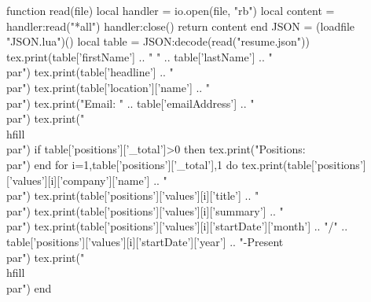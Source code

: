 \documentclass{article}
\begin{document}
\begin{luacode}
function read(file)
    local handler = io.open(file, "rb")
    local content = handler:read("*all")
    handler:close()
    return content
end
JSON = (loadfile "JSON.lua")()
local table = JSON:decode(read("resume.json"))
tex.print(table['firstName'] .. " " .. table['lastName'] .. "\\par")
tex.print(table['headline'] .. "\\par")
tex.print(table['location']['name'] .. "\\par")
tex.print("Email: " .. table['emailAddress'] .. "\\par")
tex.print("\\hfill\\par")
if table['positions']['_total']>0 then
  tex.print("Positions:\\par")
end
for i=1,table['positions']['_total'],1 do
  tex.print(table['positions']['values'][i]['company']['name'] .. "\\par")
  tex.print(table['positions']['values'][i]['title'] .. "\\par")
  tex.print(table['positions']['values'][i]['summary'] .. "\\par")
  tex.print(table['positions']['values'][i]['startDate']['month'] .. "/" .. table['positions']['values'][i]['startDate']['year'] .. "-Present\\par")
  tex.print("\\hfill\\par")
end

\end{luacode}
\end{document}
